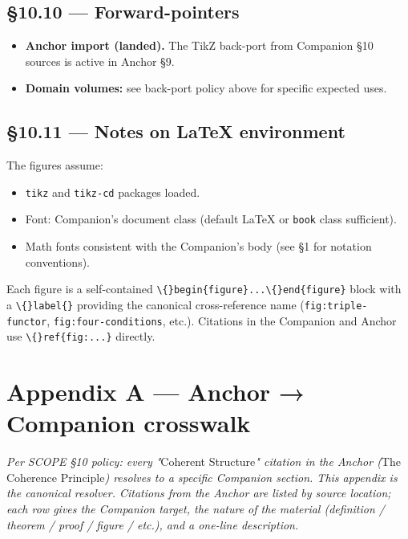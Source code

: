 \documentclass[11pt, openany]{book}
\newcommand{\sectionbreak}{\clearpage}
\begin{document}
\sectionbreak

\section{§10.10 --- Forward-pointers}

\begin{itemize}
\item \textbf{Anchor import (landed).} The TikZ back-port from Companion §10 sources is active in Anchor §9.
\item \textbf{Domain volumes:} see back-port policy above for specific expected uses.
\end{itemize}

\sectionbreak

\section{§10.11 --- Notes on LaTeX environment}

The figures assume:

\begin{itemize}
\item \texttt{tikz} and \texttt{tikz-cd} packages loaded.
\item Font: Companion's document class (default LaTeX or \texttt{book} class sufficient).
\item Math fonts consistent with the Companion's body (see §1 for notation conventions).
\end{itemize}

Each figure is a self-contained \texttt{\textbackslash\{\}begin\{figure\}...\textbackslash\{\}end\{figure\}} block with a \texttt{\textbackslash\{\}label\{\}} providing the canonical cross-reference name (\texttt{fig:triple-functor}, \texttt{fig:four-conditions}, etc.). Citations in the Companion and Anchor use \texttt{\textbackslash\{\}ref\{fig:...\}} directly.

\sectionbreak


\chapter{Appendix A — Anchor → Companion crosswalk}


\textit{Per SCOPE §10 policy: every "}Coherent Structure\textit{" citation in the Anchor (}The Coherence Principle\textit{) resolves to a specific Companion section. This appendix is the canonical resolver. Citations from the Anchor are listed by source location; each row gives the Companion target, the nature of the material (definition / theorem / proof / figure / etc.), and a one-line description.}
\end{document}
